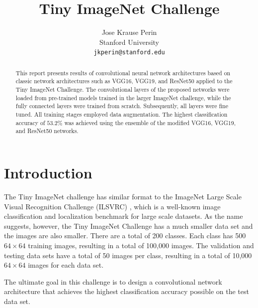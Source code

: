 \documentclass[10pt,twocolumn,letterpaper]{article}
\begin{document}
\title{Tiny ImageNet Challenge}

\author{Jose Krause Perin\\
Stanford University\\
{\tt\small jkperin@stanford.edu}
}

\maketitle

\begin{abstract}
This report presents results of convolutional neural network architectures based on classic network architectures such as VGG16, VGG19, and ResNet50 applied to the Tiny ImageNet Challenge. The convolutional layers of the proposed networks were loaded from pre-trained models trained in the larger ImageNet challenge, while the fully connected layers were trained from scratch. Subsequently, all layers were fine tuned. All training stages employed data augmentation. The highest classification accuracy of $53.2\%$ was achieved using the ensemble of the modified VGG16, VGG19, and ResNet50 networks.
\end{abstract}

\section{Introduction}

The Tiny ImageNet challenge has similar format to the ImageNet Large Scale Visual Recognition Challenge (ILSVRC) \cite{ILSVRC15}, which is a well-known image classification and localization benchmark for large scale datasets. As the name suggests, however, the Tiny ImageNet Challenge has a much smaller data set and the images are also smaller. There are a total of 200 classes. Each class has 500 $64\times 64$ training images, resulting in a total of 100,000 images. The validation and testing data sets have a total of 50 images per class, resulting in a total of 10,000 $64\times 64$ images for each data set. 

The ultimate goal in this challenge is to design a convolutional network architecture that achieves the highest classification accuracy possible on the test data set.
\end{document}
